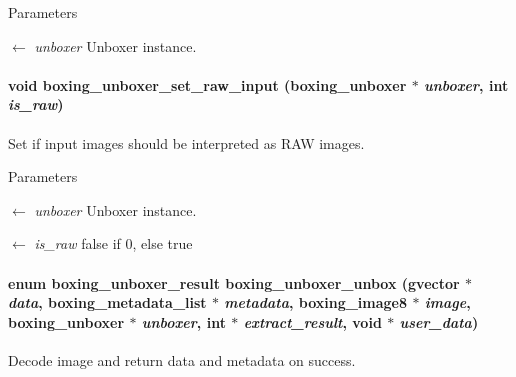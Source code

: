 \begin{DoxyParams}{Parameters}
\item[\mbox{$\leftarrow$} {\em unboxer}]Unboxer instance. \end{DoxyParams}
\hypertarget{group__unboxer_gaa35a6cc3bb000da1ae59f1d99fefe488}{
\paragraph[{boxing\_\-unboxer\_\-set\_\-raw\_\-input}]{\setlength{\rightskip}{0pt plus 5cm}void boxing\_\-unboxer\_\-set\_\-raw\_\-input (boxing\_\-unboxer $\ast$ {\em unboxer}, \/  int {\em is\_\-raw})}\hfill}
\label{group__unboxer_gaa35a6cc3bb000da1ae59f1d99fefe488}
Set if input images should be interpreted as RAW images.


\begin{DoxyParams}{Parameters}
\item[\mbox{$\leftarrow$} {\em unboxer}]Unboxer instance. \item[\mbox{$\leftarrow$} {\em is\_\-raw}]false if 0, else true \end{DoxyParams}
\hypertarget{group__unboxer_ga832bea46817eb5b565687abc0d7635fd}{
\paragraph[{boxing\_\-unboxer\_\-unbox}]{\setlength{\rightskip}{0pt plus 5cm}enum {\bf boxing\_\-unboxer\_\-result} boxing\_\-unboxer\_\-unbox (gvector $\ast$ {\em data}, \/  boxing\_\-metadata\_\-list $\ast$ {\em metadata}, \/  boxing\_\-image8 $\ast$ {\em image}, \/  boxing\_\-unboxer $\ast$ {\em unboxer}, \/  int $\ast$ {\em extract\_\-result}, \/  void $\ast$ {\em user\_\-data})}\hfill}
\label{group__unboxer_ga832bea46817eb5b565687abc0d7635fd}
Decode image and return data and metadata on success.


